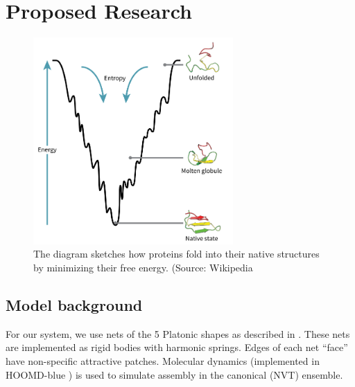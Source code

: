 \section{Proposed Research}

\begin{figure}[t]
\begin{center}
\includegraphics[width=3in]{../figures/foldingfunnel.png}
\caption{The diagram sketches how proteins fold into their native structures by minimizing their free energy. (Source: Wikipedia}
\label{fig:funnel}
\end{center}
\end{figure}

\subsection{Model background}
For our system, we use nets of the 5 Platonic shapes as described in \cite{Dodd_2018_unpublished}.
These nets are implemented as rigid bodies with harmonic springs.
Edges of each net ``face'' have non-specific attractive patches.
Molecular dynamics (implemented in HOOMD-blue \cite{HOOMD_2008, HOOMD_2015}) is used to simulate assembly in the canonical (NVT) ensemble.

